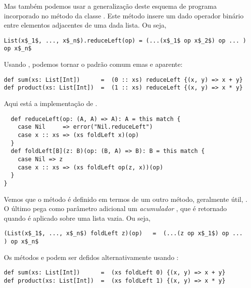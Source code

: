 Mas também podemos usar a generalização deste esquema de programa incorporado no método 
 da classe . Este método insere um dado operador binário entre
elementos adjacentes de uma dada lista. Ou seja, 
\begin{lstlisting}
List(x$_1$, ..., x$_n$).reduceLeft(op) = (...(x$_1$ op x$_2$) op ... ) op x$_n$
\end{lstlisting}
Usando , podemos tornar o padrão comum emas  e 
aparente:
\begin{lstlisting}
def sum(xs: List[Int])      =  (0 :: xs) reduceLeft {(x, y) => x + y}
def product(xs: List[Int])  =  (1 :: xs) reduceLeft {(x, y) => x * y}
\end{lstlisting}
Aqui está a implementação de .
\begin{lstlisting}
  def reduceLeft(op: (A, A) => A): A = this match {
    case Nil     => error("Nil.reduceLeft")
    case x :: xs => (xs foldLeft x)(op)
  }
  def foldLeft[B](z: B)(op: (B, A) => B): B = this match {
    case Nil => z
    case x :: xs => (xs foldLeft op(z, x))(op)
  }
}
\end{lstlisting}

Vemos que o método  é definido em termos de um outro método, geralmente útil, 
. O último pega como parâmetro adicional um {\em acumulador} , que é 
retornado quando  é aplicado sobre uma lista vazia. Ou seja, 
\begin{lstlisting}
(List(x$_1$, ..., x$_n$) foldLeft z)(op)   =  (...(z op x$_1$) op ... ) op x$_n$
\end{lstlisting}
Os métodos  e  podem ser defidos alternativamente usando :
\begin{lstlisting}
def sum(xs: List[Int])      =  (xs foldLeft 0) {(x, y) => x + y}
def product(xs: List[Int])  =  (xs foldLeft 1) {(x, y) => x * y}
\end{lstlisting}

